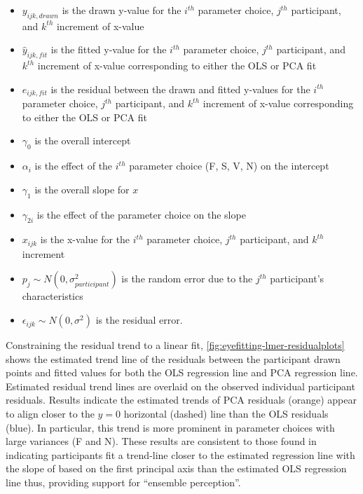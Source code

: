 \documentclass[12pt]{article}
\providecommand{\tightlist}{%
  \setlength{\itemsep}{0pt}\setlength{\parskip}{0pt}}
\begin{document}
\begin{itemize}
\tightlist
\item
  \(y_{ijk,drawn}\) is the drawn y-value for the \(i^{th}\) parameter
  choice, \(j^{th}\) participant, and \(k^{th}\) increment of x-value
\item
  \(\hat y_{ijk,fit}\) is the fitted y-value for the \(i^{th}\)
  parameter choice, \(j^{th}\) participant, and \(k^{th}\) increment of
  x-value corresponding to either the OLS or PCA fit
\item
  \(e_{ijk,fit}\) is the residual between the drawn and fitted y-values
  for the \(i^{th}\) parameter choice, \(j^{th}\) participant, and
  \(k^{th}\) increment of x-value corresponding to either the OLS or PCA
  fit
\item
  \(\gamma_0\) is the overall intercept
\item
  \(\alpha_i\) is the effect of the \(i^{th}\) parameter choice (F, S,
  V, N) on the intercept
\item
  \(\gamma_1\) is the overall slope for \(x\)
\item
  \(\gamma_{2i}\) is the effect of the parameter choice on the slope
\item
  \(x_{ijk}\) is the x-value for the \(i^{th}\) parameter choice,
  \(j^{th}\) participant, and \(k^{th}\) increment
\item
  \(p_{j} \sim N(0, \sigma^2_{participant})\) is the random error due to
  the \(j^{th}\) participant's characteristics
\item
  \(\epsilon_{ijk} \sim N(0, \sigma^2)\) is the residual error.
\end{itemize}

Constraining the residual trend to a linear fit,
\cref{fig:eyefitting-lmer-residualplots} shows the estimated trend line
of the residuals between the participant drawn points and fitted values
for both the OLS regression line and PCA regression line. Estimated
residual trend lines are overlaid on the observed individual participant
residuals. Results indicate the estimated trends of PCA residuals
(orange) appear to align closer to the \(y=0\) horizontal (dashed) line
than the OLS residuals (blue). In particular, this trend is more
prominent in parameter choices with large variances (F and N). These
results are consistent to those found in \citet{mosteller1981eye}
indicating participants fit a trend-line closer to the estimated
regression line with the slope of based on the first principal axis than
the estimated OLS regression line thus, providing support for ``ensemble
perception''.
\end{document}
